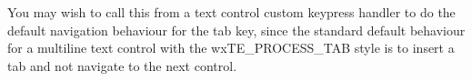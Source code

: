 
You may wish to call this from a text control custom keypress handler to do the default
navigation behaviour for the tab key, since the standard default behaviour for
a multiline text control with the wxTE\_PROCESS\_TAB style is to insert a tab
and not navigate to the next control.

